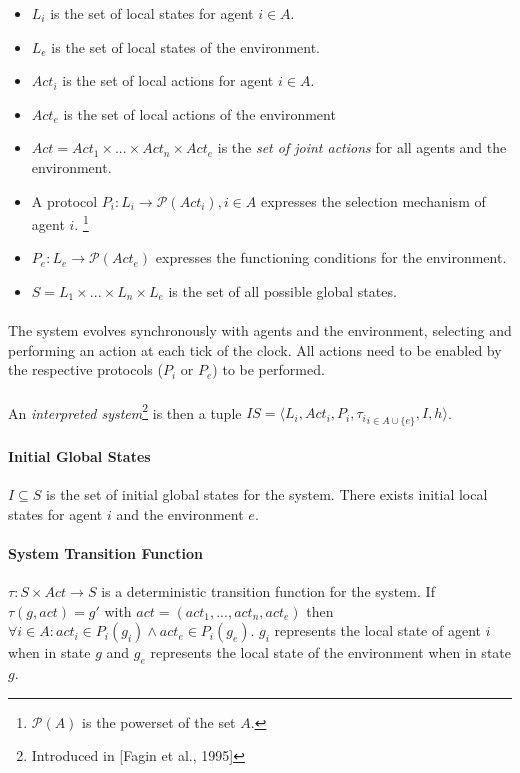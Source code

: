 \documentclass{article}
\theoremstyle{plain}
\theoremstyle{definition}
\begin{document}
\begin{multicols}{2}
\begin{itemize}
\item $L_i$ is the set of local states for agent $i \in A$.
\item $L_e$ is the set of local states of the environment.
\item $Act_i$ is the set of local actions for agent $i \in A$.
\item $Act_e$ is the set of local actions of the environment
\item $Act = Act_1 \times ... \times Act_n \times Act_e$ is the \textit{set of joint actions} for all agents and the environment.
\item A protocol $P_i: L_i \rightarrow \mathcal{P}(Act_i), i \in A$ expresses the selection mechanism of agent $i$. \footnote{$\mathcal{P}(A)$ is the powerset of the set $A$.}
\item $P_e: L_e \rightarrow \mathcal{P}(Act_e)$ expresses the functioning conditions for the environment.
\item $S = L_1 \times ... \times L_n \times L_e$ is the set of all possible global states.
\end{itemize}

\paragraph{} The system evolves synchronously with agents and the environment, selecting and performing an action at each tick of the clock. All actions need to be enabled by the respective protocols ($P_i$ or $P_e$) to be performed. 

\paragraph{} An \textit{interpreted system}\footnote{Introduced in [Fagin et al., 1995]} is then a tuple $IS = \langle {L_i, Act_i, P_i, \tau_i}_{i \in A\cup\{e\}}, I, h \rangle$.

\paragraph{Initial Global States} $I \subseteq S$ is the set of initial global states for the system. There exists initial local states for agent $i$ and the environment $e$.

\paragraph{System Transition Function} $\tau: S \times Act \rightarrow S$ is a deterministic transition function for the system. If $\tau(g, act) = g'$ with $act = (act_1, ..., act_n, act_e)$ then $\forall i \in A: act_i \in P_i(g_i) \land act_e \in P_i(g_e)$. $g_i$ represents the local state of agent $i$ when in state $g$ and $g_e$ represents the local state of the environment when in state $g$.


\end{multicols}
\end{document}
